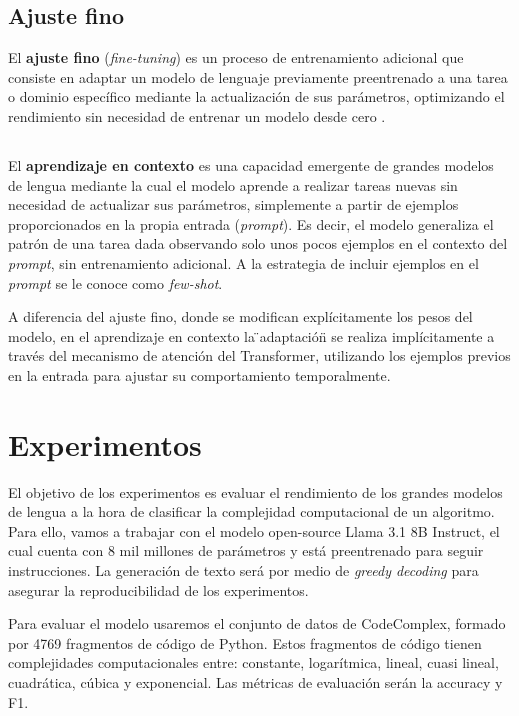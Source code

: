 \documentclass[12pt,twoside]{article}
\begin{document}
\subsection{Ajuste fino}
El \textbf{ajuste fino} (\textit{fine-tuning}) es un proceso de entrenamiento adicional que consiste en adaptar un modelo de lenguaje previamente preentrenado a una tarea o dominio específico mediante la actualización de sus parámetros, optimizando el rendimiento sin necesidad de entrenar un modelo desde cero \cite{fine-tuning}.

\subsection{}
El \textbf{aprendizaje en contexto} \cite{in-context learning} es una capacidad emergente de grandes modelos de lengua mediante la cual el modelo aprende a realizar tareas nuevas sin necesidad de actualizar sus parámetros, simplemente a partir de ejemplos proporcionados en la propia entrada (\textit{prompt}). Es decir, el modelo generaliza el patrón de una tarea dada observando solo unos pocos ejemplos en el contexto del \textit{prompt}, sin entrenamiento adicional. A la estrategia de incluir ejemplos en el \textit{prompt} se le conoce como \textit{few-shot}.

A diferencia del ajuste fino, donde se modifican explícitamente los pesos del modelo, en el aprendizaje en contexto la \"{}adaptación\"{} se realiza implícitamente a través del mecanismo de atención del Transformer, utilizando los ejemplos previos en la entrada para ajustar su comportamiento temporalmente.

\section{Experimentos}
El objetivo de los experimentos es evaluar el rendimiento de los grandes modelos de lengua a la hora de clasificar la complejidad computacional de un algoritmo. Para ello, vamos a trabajar con el modelo open-source Llama 3.1 8B Instruct, el cual cuenta con 8 mil millones de parámetros y está preentrenado para seguir instrucciones. La generación de texto será por medio de \textit{greedy decoding} para asegurar la reproducibilidad de los experimentos.

Para evaluar el modelo usaremos el conjunto de datos de CodeComplex, formado por 4769 fragmentos de código de Python. Estos fragmentos de código tienen complejidades computacionales entre: constante, logarítmica, lineal, cuasi lineal, cuadrática, cúbica y exponencial. Las métricas de evaluación serán la accuracy y F1.
\end{document}
